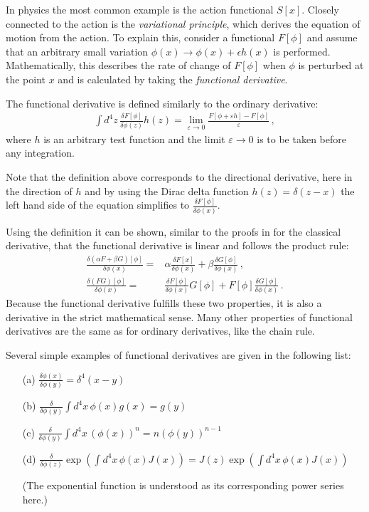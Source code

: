 \documentclass[11pt]{latex/exercise}
\begin{document}
In physics the most common example is the action functional $S[x]$.
Closely connected to the action is the \emph{variational principle}, which derives the equation of motion from the action.
To explain this, consider a functional $F[\phi]$ and assume that an arbitrary small variation $\phi(x) \to \phi(x) + \epsilon h(x)$ is performed.
Mathematically, this describes the rate of change of $F[\phi]$ when $\phi$ is perturbed at the point $x$ and is calculated by taking the \emph{functional derivative}.

The functional derivative is defined similarly to the ordinary derivative:
\begin{align}
    \int d^4 z\, \frac{\delta F[\phi]}{\delta \phi(z)} h(z)
    =
    \lim \limits_{\varepsilon \rightarrow 0}\frac{F[\phi+\varepsilon h]-F[\phi]}{\varepsilon}\,,
\end{align}
where $h$ is an arbitrary test function and the limit $\varepsilon \to 0 $ is to be taken before any integration.

Note that the definition above corresponds to the directional derivative, here in the direction of $h$ and by using the Dirac delta function
$h(z)=\delta(z-x)$
the left hand side of the equation simplifies to
$\frac{\delta F[\phi]}{\delta \phi(x)}$.

Using the definition it can be shown, similar to the proofs in for the classical derivative, that the functional derivative is linear and follows the product rule:
\begin{align}
    \frac{\delta(\alpha F+\beta G)[\phi]}{\delta \phi(x)}
    ={} &
    \alpha \frac{\delta F[x]}{\delta \phi(x)}+\beta \frac{\delta G[\phi]}{\delta \phi(x)}\,,
    \\
    \frac{\delta( F G)[\phi]}{\delta \phi(x)}
    ={} &
    \frac{\delta F[\phi]}{\delta \phi(x)}G[\phi]+ F[\phi]\frac{\delta G[\phi]}{\delta \phi(x)}\,.
\end{align}
Because the functional derivative fulfills these two properties, it is also a derivative in the strict mathematical sense.
Many other properties of functional derivatives are the same as for ordinary derivatives, like the chain rule.

Several simple examples of functional derivatives are given in the following list:
\begin{itemize}
    \item[(a)] $\frac{\delta \phi(x)}{\delta \phi(y)} =  \delta^4(x-y)$
    \item[(b)] $\frac{\delta}{\delta \phi(y)} \int d^4 x\, \phi(x) g(x) = g(y)$
    \item[(c)] $\frac{\delta}{\delta \phi(y)} \int d^4 x\, (\phi(x))^n = n (\phi(y))^{n-1}$
    \item[(d)] $\frac{\delta}{\delta\phi\left(z\right)}\exp\left(\int d^4 x\,\phi\left(x\right)J\left(x\right)\right) = J(z) \exp\left(\int d^4 x\,\phi\left(x\right)J\left(x\right)\right)$

          (The exponential function is understood as its corresponding power series here.)
\end{itemize}
\end{document}
